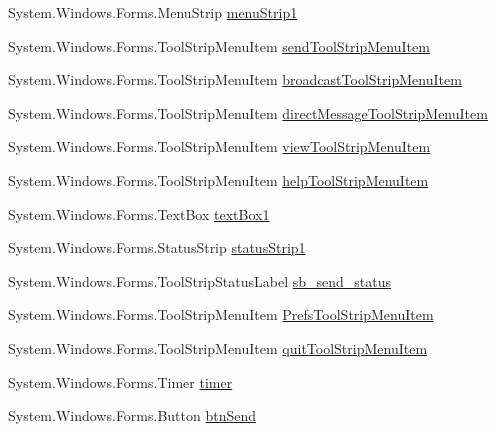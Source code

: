 \begin{DoxyCompactItemize}
\-System.\-Windows.\-Forms.\-Menu\-Strip \hyperlink{class_sr_p___classroom_inq_1_1frm_classrrom_inq_a549704b03b13cfbb5cbc07c18c0c600a}{menu\-Strip1}
\item 
\-System.\-Windows.\-Forms.\-Tool\-Strip\-Menu\-Item \hyperlink{class_sr_p___classroom_inq_1_1frm_classrrom_inq_ab491a97cbd395fd4e69e4312fdc48eeb}{send\-Tool\-Strip\-Menu\-Item}
\item 
\-System.\-Windows.\-Forms.\-Tool\-Strip\-Menu\-Item \hyperlink{class_sr_p___classroom_inq_1_1frm_classrrom_inq_ac34894d134f025ca6e53b41c744bcf8e}{broadcast\-Tool\-Strip\-Menu\-Item}
\item 
\-System.\-Windows.\-Forms.\-Tool\-Strip\-Menu\-Item \hyperlink{class_sr_p___classroom_inq_1_1frm_classrrom_inq_a8df7e0c2f5ac4cb1494004d85940a786}{direct\-Message\-Tool\-Strip\-Menu\-Item}
\item 
\-System.\-Windows.\-Forms.\-Tool\-Strip\-Menu\-Item \hyperlink{class_sr_p___classroom_inq_1_1frm_classrrom_inq_a703cf9f48d3d8aa2b88e8d9490600c54}{view\-Tool\-Strip\-Menu\-Item}
\item 
\-System.\-Windows.\-Forms.\-Tool\-Strip\-Menu\-Item \hyperlink{class_sr_p___classroom_inq_1_1frm_classrrom_inq_a2cf34a0cb0b52c60e6faea821b2ce0a9}{help\-Tool\-Strip\-Menu\-Item}
\item 
\-System.\-Windows.\-Forms.\-Text\-Box \hyperlink{class_sr_p___classroom_inq_1_1frm_classrrom_inq_a3ee11679c61cc3228121b7fe4f51d0c8}{text\-Box1}
\item 
\-System.\-Windows.\-Forms.\-Status\-Strip \hyperlink{class_sr_p___classroom_inq_1_1frm_classrrom_inq_a3d73a45e941d1d5e3ac5a00180dde14a}{status\-Strip1}
\item 
\-System.\-Windows.\-Forms.\-Tool\-Strip\-Status\-Label \hyperlink{class_sr_p___classroom_inq_1_1frm_classrrom_inq_a339bcec3d748bdf74b502189fd7ca9db}{sb\-\_\-send\-\_\-status}
\item 
\-System.\-Windows.\-Forms.\-Tool\-Strip\-Menu\-Item \hyperlink{class_sr_p___classroom_inq_1_1frm_classrrom_inq_ab36e4efbf8b003fc5007cc6522901c21}{\-Prefs\-Tool\-Strip\-Menu\-Item}
\item 
\-System.\-Windows.\-Forms.\-Tool\-Strip\-Menu\-Item \hyperlink{class_sr_p___classroom_inq_1_1frm_classrrom_inq_a7e4ada35eda1d7984167b62ab487ace7}{quit\-Tool\-Strip\-Menu\-Item}
\item 
\-System.\-Windows.\-Forms.\-Timer \hyperlink{class_sr_p___classroom_inq_1_1frm_classrrom_inq_ac5fec0fdbc135ddcefc976786801ee05}{timer}
\item 
\-System.\-Windows.\-Forms.\-Button \hyperlink{class_sr_p___classroom_inq_1_1frm_classrrom_inq_a5a1b78305ac1e8f7eb40a5d135fa3525}{btn\-Send}

\end{DoxyCompactItemize}
